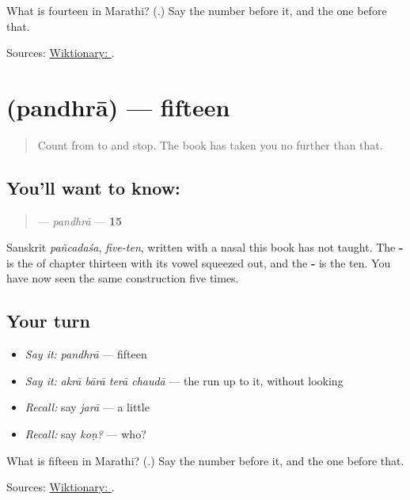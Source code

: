 \begin{tcolorbox}[breakable,colback=teal!4,colframe=teal!35!black,title={Before you move on}]
What is fourteen in Marathi? (\textbf{}.) Say the number before it, and the one before that.

Sources: \href{https://en.wiktionary.org/wiki/\%E0\%A4\%9A\%E0\%A5\%8C\%E0\%A4\%A6\%E0\%A4\%BE}{Wiktionary: }.
\end{tcolorbox}
\section[\texorpdfstring{\mr{पंधरा} (pandhrā)}{पंधरा (pandhrā)}]{ (pandhrā) — fifteen}

\label{lesson:MR-C57-pandhra}



\begin{quote}
Count from \textbf{} to \textbf{} and stop. The book has taken you no further than that.
\end{quote}

\subsection*{You'll want to know: }
\begin{quote}
\textbf{} — \emph{pandhrā} — \textbf{15}
\end{quote}

Sanskrit \emph{pañcadaśa}, \emph{five-ten}, written with a nasal this book has not taught. The \textbf{-} is the \textbf{} of chapter thirteen with its vowel squeezed out, and the \textbf{-} is the ten. You have now seen the same construction five times.

\subsection*{Your turn}
\begin{itemize}
\raggedright
  \item \emph{Say it:} \emph{pandhrā} — fifteen
  \item \emph{Say it:} \emph{akrā bārā terā chaudā} — the run up to it, without looking
  \item \emph{Recall:} say \emph{jarā} — a little
  \item \emph{Recall:} say \emph{koṇ?} — who?
\end{itemize}

\begin{tcolorbox}[breakable,colback=teal!4,colframe=teal!35!black,title={Before you move on}]
What is fifteen in Marathi? (\textbf{}.) Say the number before it, and the one before that.

Sources: \href{https://en.wiktionary.org/wiki/\%E0\%A4\%AA\%E0\%A4\%82\%E0\%A4\%A7\%E0\%A4\%B0\%E0\%A4\%BE}{Wiktionary: }.
\end{tcolorbox}
